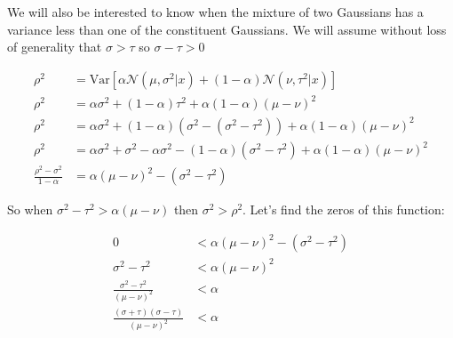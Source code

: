 \documentclass{article}
\newcommand{\Var}{\mathrm{Var}}
\begin{document}
We will also be interested to know when the mixture of two Gaussians has a variance less than one of the constituent Gaussians.  We will assume without loss of generality that $\sigma > \tau$ so $\sigma - \tau > 0$

\begin{equation} \begin{aligned}
    \rho^2 & = \Var\left[ \alpha \mathcal{N}\left( \mu, \sigma^2 | x \right) + (1-\alpha)\mathcal{N}( \nu, \tau^2 | x ) \right] \\
    \rho^2 & = \alpha \sigma^2 + (1-\alpha)\tau^2 + \alpha (1-\alpha)( \mu - \nu )^2 \\
    \rho^2 & = \alpha \sigma^2 + (1-\alpha)(\sigma^2 - (\sigma^2 - \tau^2)) + \alpha (1-\alpha) ( \mu - \nu )^2 \\
    \rho^2 & = \alpha \sigma^2 + \sigma^2 - \alpha \sigma^2 - (1-\alpha)(\sigma^2 - \tau^2) + \alpha (1-\alpha)(\mu - \nu)^2 \\
    \frac{\rho^2 - \sigma^2}{1-\alpha} & = \alpha(\mu - \nu)^2 - (\sigma^2 - \tau^2)
\end{aligned} \end{equation}

So when $\sigma^2 - \tau^2 > \alpha(\mu - \nu)$ then $\sigma^2 > \rho^2$.  Let's find the zeros of this function:

\begin{equation} \begin{aligned}
     0 & < \alpha (\mu - \nu)^2 - (\sigma^2 - \tau^2) \\
\sigma^2 - \tau^2 & < \alpha (\mu - \nu)^2 \\
\frac{\sigma^2 - \tau^2}{(\mu - \nu)^2} & < \alpha \\
\frac{(\sigma + \tau)(\sigma - \tau)}{(\mu - \nu)^2} & < \alpha
\end{aligned} \end{equation}
\end{document}
